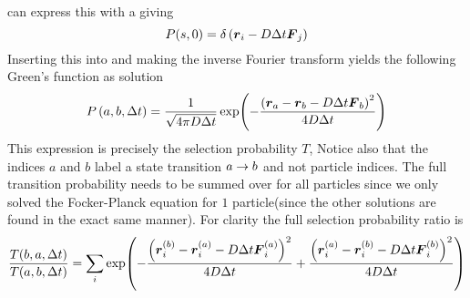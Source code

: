         can express this with a \cite{GriffQuan,
        boasMath} giving
            \begin{equation}
                P(s,0) = \delta\left(\boldsymbol{{r}}_i - D\Delta t\boldsymbol{{F}}_j\right)
            \end{equation}
        Inserting this into  and making the inverse Fourier
        transform yields the following Green's function as solution
            \begin{equation}
                P\left(a, b, \Delta t\right) = \frac{1}{\sqrt{4\pi D\Delta t}}
                \exp(-\frac{\left(\boldsymbol{{r}}_a - \boldsymbol{{r}}_b - D\Delta t
                \boldsymbol{{F}}_b\right)^2}{4D\Delta t})
            \end{equation}
        This expression is precisely the selection probability $T$, Notice also
        that the indices $a$ and $b$ label a state transition $a\rightarrow b$ and not
        particle indices. The full transition probability needs to be summed
        over for all particles since we only solved the Focker-Planck equation
        for $1$ particle(since the other solutions are found in the exact same
        manner). For clarity the full selection probability ratio is
            \begin{equation}
                \frac{T(b,a,\Delta t)}{T(a,b,\Delta t)} = \sum_i
                \exp(-\frac{\left(\boldsymbol{{r}}^{(b)}_i - \boldsymbol{{r}}^{(a)}_i - D\Delta
                t \boldsymbol{{F}}^{(a)}_i\right)^2}{4D\Delta t}
                +\frac{\left(\boldsymbol{{r}}^{(a)}_i - \boldsymbol{{r}}^{(b)}_i - D\Delta t
                \boldsymbol{{F}}^{(b)}_i\right)^2}{4D\Delta t})
            \end{equation}

